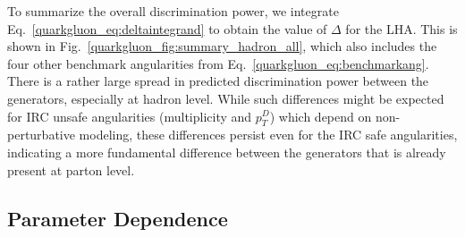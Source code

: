 \documentclass[11pt]{cernrep}
\begin{document}
To summarize the overall discrimination power, we integrate Eq.~\eqref{quarkgluon_eq:deltaintegrand} to obtain the value of $\Delta$ for the LHA.  This is shown in Fig.~\ref{quarkgluon_fig:summary_hadron_all}, which also includes the four other benchmark angularities from Eq.~\eqref{quarkgluon_eq:benchmarkang}.  There is a rather large spread in predicted discrimination power between the generators, especially at hadron level.  While such differences might be expected for IRC unsafe angularities (multiplicity and $p_T^D$) which depend on non-perturbative modeling, these differences persist even for the IRC safe angularities, indicating a more fundamental difference between the generators that is already present at parton level.

\subsection{Parameter Dependence}
\label{quarkgluon_sec:ee_scales}
\end{document}
